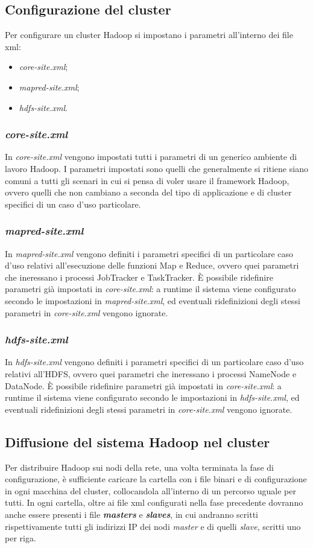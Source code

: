 \documentclass[a4paper,11pt]{report}
\begin{document}
\subsection{Configurazione del cluster}
Per configurare un cluster Hadoop si impostano i parametri all'interno dei file xml:
\begin{itemize}
 \item \emph{core-site.xml};
 \item \emph{mapred-site.xml};
 \item \emph{hdfs-site.xml}.
\end{itemize}
\subsubsection{\emph{core-site.xml}}
In \emph{core-site.xml} vengono impostati tutti i parametri di un generico ambiente di lavoro Hadoop. I parametri impostati sono quelli che
generalmente si ritiene siano comuni a tutti
gli scenari in cui si pensa di voler usare il framework Hadoop, ovvero quelli che non cambiano a seconda del tipo di applicazione e di
cluster specifici di un caso d'uso particolare.
\subsubsection{\emph{mapred-site.xml}}
In \emph{mapred-site.xml} vengono definiti i parametri specifici di un particolare caso d'uso relativi all'esecuzione delle funzioni Map e
Reduce, ovvero quei parametri che ineressano 
i processi JobTracker e TaskTracker. È possibile ridefinire parametri già impostati in \emph{core-site.xml}: a runtime 
il sistema viene configurato secondo le impostazioni in \emph{mapred-site.xml}, ed eventuali ridefinizioni degli stessi parametri in
\emph{core-site.xml} vengono ignorate.
\subsubsection{\emph{hdfs-site.xml}}
In \emph{hdfs-site.xml} vengono definiti i parametri specifici di un particolare caso d'uso relativi all'HDFS, ovvero quei parametri che
ineressano 
i processi NameNode e DataNode. È possibile ridefinire parametri già impostati in \emph{core-site.xml}: a runtime 
il sistema viene configurato secondo le impostazioni in \emph{hdfs-site.xml}, ed eventuali ridefinizioni degli stessi parametri in
\emph{core-site.xml} vengono ignorate.
\subsection{Diffusione del sistema Hadoop nel cluster}
Per distribuire Hadoop sui nodi della rete, una volta terminata la fase di configurazione, è sufficiente caricare la cartella con i file
binari e di configurazione 
in ogni macchina del cluster, collocandola all'interno di un percorso uguale per tutti. 
In ogni cartella, oltre ai file xml configurati nella fase precedente dovranno anche essere presenti i file \emph{\textbf{masters}} e
\emph{\textbf{slaves}}, in cui andranno scritti
rispettivamente tutti gli indirizzi IP dei nodi \emph{master} e di quelli \emph{slave}, scritti uno per riga. 
\end{document}

